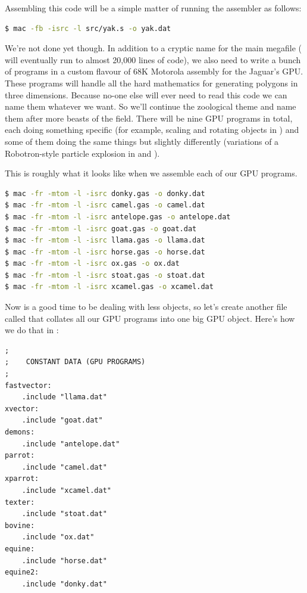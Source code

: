 Assembling this code will be a simple matter of running the  assembler as follows:

\begin{lstlisting}[language=bash]
$ mac -fb -isrc -l src/yak.s -o yak.dat
\end{lstlisting}

We're not done yet though.
In addition to a cryptic name for the main megafile ( will eventually run to almost 20,000
lines of code), we also need to write a bunch of programs in a custom flavour of 68K Motorola assembly for
the Jaguar's GPU. These programs will handle all the hard mathematics for generating polygons in three
dimensions. Because no-one else will ever need to read this code we can name them whatever we want. So
we'll continue the zoological theme and name them after more beasts of the field. There will be nine GPU
programs in total, each doing something specific (for example, scaling and rotating objects in ) 
and some of them doing the same things but slightly differently (variations of a Robotron-style particle
explosion in  and ).

This is roughly what it looks like when we assemble each of our GPU programs.
\begin{lstlisting}[language=bash]
$ mac -fr -mtom -l -isrc donky.gas -o donky.dat
$ mac -fr -mtom -l -isrc camel.gas -o camel.dat
$ mac -fr -mtom -l -isrc antelope.gas -o antelope.dat
$ mac -fr -mtom -l -isrc goat.gas -o goat.dat
$ mac -fr -mtom -l -isrc llama.gas -o llama.dat
$ mac -fr -mtom -l -isrc horse.gas -o horse.dat
$ mac -fr -mtom -l -isrc ox.gas -o ox.dat
$ mac -fr -mtom -l -isrc stoat.gas -o stoat.dat
$ mac -fr -mtom -l -isrc xcamel.gas -o xcamel.dat
\end{lstlisting}

Now is a good time to be dealing with less objects, so let's create another file called  that
collates all our GPU programs into one big GPU object. Here's how we do that in :

\begin{lstlisting}
;
;    CONSTANT DATA (GPU PROGRAMS)
;
fastvector:
    .include "llama.dat"
xvector:
    .include "goat.dat"
demons:
    .include "antelope.dat"
parrot:
    .include "camel.dat"
xparrot:
    .include "xcamel.dat"
texter:
    .include "stoat.dat"
bovine:
    .include "ox.dat"
equine:
    .include "horse.dat"
equine2:
    .include "donky.dat"
\end{lstlisting}


